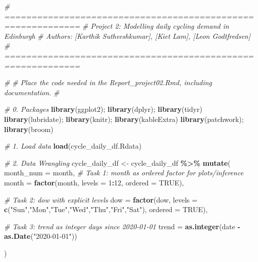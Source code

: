 \documentclass[
]{article}
\newenvironment{Shaded}{\begin{snugshade}}{\end{snugshade}}
\newcommand{\AttributeTok}[1]{\textcolor[rgb]{0.13,0.29,0.53}{#1}}
\newcommand{\CommentTok}[1]{\textcolor[rgb]{0.56,0.35,0.01}{\textit{#1}}}
\newcommand{\ConstantTok}[1]{\textcolor[rgb]{0.56,0.35,0.01}{#1}}
\newcommand{\DecValTok}[1]{\textcolor[rgb]{0.00,0.00,0.81}{#1}}
\newcommand{\FunctionTok}[1]{\textcolor[rgb]{0.13,0.29,0.53}{\textbf{#1}}}
\newcommand{\NormalTok}[1]{#1}
\newcommand{\OtherTok}[1]{\textcolor[rgb]{0.56,0.35,0.01}{#1}}
\newcommand{\SpecialCharTok}[1]{\textcolor[rgb]{0.81,0.36,0.00}{\textbf{#1}}}
\newcommand{\StringTok}[1]{\textcolor[rgb]{0.31,0.60,0.02}{#1}}
\begin{document}
\begin{Shaded}
\begin{Highlighting}[]
\CommentTok{\# ============================================================}
\CommentTok{\# Project 2: Modelling daily cycling demand in Edinburgh}
\CommentTok{\# Authors: [Karthik Sutheeshkumar], [Kiet Lam], [Leon Godtfredsen]}
\CommentTok{\# ============================================================}

\CommentTok{\#}
\CommentTok{\# Place the code needed in the Report\_project02.Rmd, including documentation.}
\CommentTok{\#}

\CommentTok{\# 0. Packages}
\FunctionTok{library}\NormalTok{(ggplot2); }\FunctionTok{library}\NormalTok{(dplyr); }\FunctionTok{library}\NormalTok{(tidyr)}
\FunctionTok{library}\NormalTok{(lubridate); }\FunctionTok{library}\NormalTok{(knitr); }\FunctionTok{library}\NormalTok{(kableExtra)}
\FunctionTok{library}\NormalTok{(patchwork); }\FunctionTok{library}\NormalTok{(broom)}

\CommentTok{\# 1. Load data}
\FunctionTok{load}\NormalTok{(}\StringTok{\textquotesingle{}cycle\_daily\_df.Rdata\textquotesingle{}}\NormalTok{)}

\CommentTok{\# 2. Data Wrangling }
\NormalTok{cycle\_daily\_df }\OtherTok{\textless{}{-}}\NormalTok{ cycle\_daily\_df }\SpecialCharTok{\%\textgreater{}\%}
  \FunctionTok{mutate}\NormalTok{(}
    \AttributeTok{month\_num =}\NormalTok{ month,}
    \CommentTok{\# Task 1: month as ordered factor for plots/inference}
    \AttributeTok{month =} \FunctionTok{factor}\NormalTok{(month, }\AttributeTok{levels =} \DecValTok{1}\SpecialCharTok{:}\DecValTok{12}\NormalTok{, }\AttributeTok{ordered =} \ConstantTok{TRUE}\NormalTok{),}
    
    \CommentTok{\# Task 2: dow with explicit levels }
    \AttributeTok{dow =} \FunctionTok{factor}\NormalTok{(dow, }\AttributeTok{levels =} \FunctionTok{c}\NormalTok{(}\StringTok{"Sun"}\NormalTok{,}\StringTok{"Mon"}\NormalTok{,}\StringTok{"Tue"}\NormalTok{,}\StringTok{"Wed"}\NormalTok{,}\StringTok{"Thu"}\NormalTok{,}\StringTok{"Fri"}\NormalTok{,}\StringTok{"Sat"}\NormalTok{), }\AttributeTok{ordered =} \ConstantTok{TRUE}\NormalTok{),}
    
    
    \CommentTok{\# Task 3: trend as integer days since 2020{-}01{-}01}
    \AttributeTok{trend =} \FunctionTok{as.integer}\NormalTok{(date }\SpecialCharTok{{-}} \FunctionTok{as.Date}\NormalTok{(}\StringTok{"2020{-}01{-}01"}\NormalTok{))}

\NormalTok{  )}




\end{Highlighting}
\end{Shaded}
\end{document}
